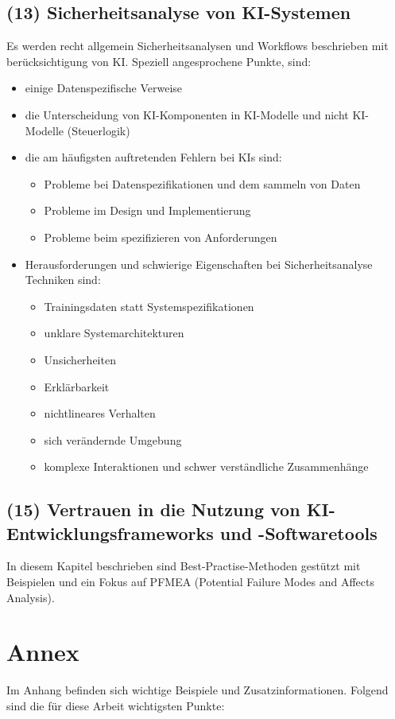 \subsection{(13) Sicherheitsanalyse von KI-Systemen}
Es werden recht allgemein Sicherheitsanalysen und Workflows beschrieben mit berücksichtigung von KI. 
Speziell angesprochene Punkte, sind: 
\begin{itemize}
  \item einige Datenspezifische Verweise
  \item die Unterscheidung von KI-Komponenten in KI-Modelle und nicht KI-Modelle (Steuerlogik)
  \item die am häufigsten auftretenden Fehlern bei KIs sind:
    \begin{itemize}
      \item Probleme bei Datenspezifikationen und dem sammeln von Daten
      \item Probleme im Design und Implementierung
      \item Probleme beim spezifizieren von Anforderungen
    \end{itemize}
  \item Herausforderungen und schwierige Eigenschaften bei Sicherheitsanalyse Techniken sind:
    \begin{itemize}
      \item Trainingsdaten statt Systemspezifikationen
      \item unklare Systemarchitekturen
      \item Unsicherheiten
      \item Erklärbarkeit
      \item nichtlineares Verhalten
      \item sich verändernde Umgebung
      \item komplexe Interaktionen und schwer verständliche Zusammenhänge
    \end{itemize}
\end{itemize}


\subsection{(15) Vertrauen in die Nutzung von KI-Entwicklungsframeworks und -Softwaretools}
In diesem Kapitel beschrieben sind Best-Practise-Methoden gestützt mit Beispielen und ein Fokus auf 
PFMEA (Potential Failure Modes and Affects Analysis). 


\section{Annex}
Im Anhang befinden sich wichtige Beispiele und Zusatzinformationen. Folgend sind die 
für diese Arbeit wichtigsten Punkte:

